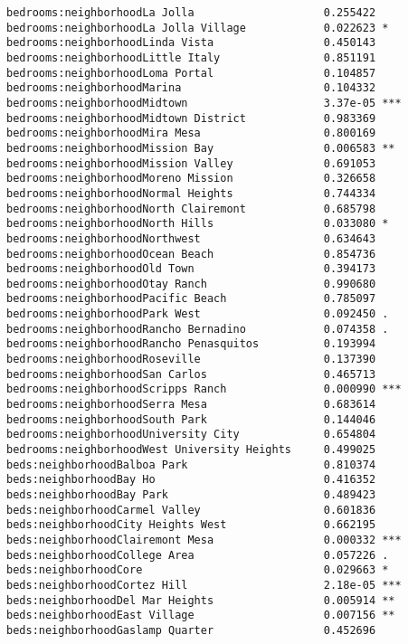 \documentclass[
  letterpaper,
  krantz2]{style/krantz}
\begin{document}
\begin{verbatim}
bedrooms:neighborhoodLa Jolla                    0.255422    
bedrooms:neighborhoodLa Jolla Village            0.022623 *  
bedrooms:neighborhoodLinda Vista                 0.450143    
bedrooms:neighborhoodLittle Italy                0.851191    
bedrooms:neighborhoodLoma Portal                 0.104857    
bedrooms:neighborhoodMarina                      0.104332    
bedrooms:neighborhoodMidtown                     3.37e-05 ***
bedrooms:neighborhoodMidtown District            0.983369    
bedrooms:neighborhoodMira Mesa                   0.800169    
bedrooms:neighborhoodMission Bay                 0.006583 ** 
bedrooms:neighborhoodMission Valley              0.691053    
bedrooms:neighborhoodMoreno Mission              0.326658    
bedrooms:neighborhoodNormal Heights              0.744334    
bedrooms:neighborhoodNorth Clairemont            0.685798    
bedrooms:neighborhoodNorth Hills                 0.033080 *  
bedrooms:neighborhoodNorthwest                   0.634643    
bedrooms:neighborhoodOcean Beach                 0.854736    
bedrooms:neighborhoodOld Town                    0.394173    
bedrooms:neighborhoodOtay Ranch                  0.990680    
bedrooms:neighborhoodPacific Beach               0.785097    
bedrooms:neighborhoodPark West                   0.092450 .  
bedrooms:neighborhoodRancho Bernadino            0.074358 .  
bedrooms:neighborhoodRancho Penasquitos          0.193994    
bedrooms:neighborhoodRoseville                   0.137390    
bedrooms:neighborhoodSan Carlos                  0.465713    
bedrooms:neighborhoodScripps Ranch               0.000990 ***
bedrooms:neighborhoodSerra Mesa                  0.683614    
bedrooms:neighborhoodSouth Park                  0.144046    
bedrooms:neighborhoodUniversity City             0.654804    
bedrooms:neighborhoodWest University Heights     0.499025    
beds:neighborhoodBalboa Park                     0.810374    
beds:neighborhoodBay Ho                          0.416352    
beds:neighborhoodBay Park                        0.489423    
beds:neighborhoodCarmel Valley                   0.601836    
beds:neighborhoodCity Heights West               0.662195    
beds:neighborhoodClairemont Mesa                 0.000332 ***
beds:neighborhoodCollege Area                    0.057226 .  
beds:neighborhoodCore                            0.029663 *  
beds:neighborhoodCortez Hill                     2.18e-05 ***
beds:neighborhoodDel Mar Heights                 0.005914 ** 
beds:neighborhoodEast Village                    0.007156 ** 
beds:neighborhoodGaslamp Quarter                 0.452696    

\end{verbatim}
\end{document}
